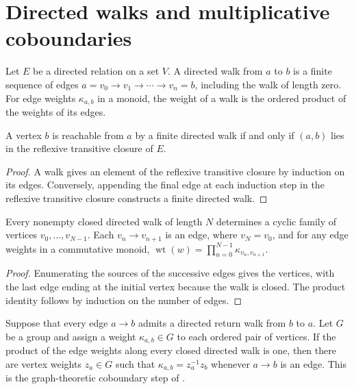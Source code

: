 \section{Directed walks and multiplicative coboundaries}

Let $E$ be a directed relation on a set $V$. A directed walk from $a$ to
$b$ is a finite sequence of edges $a=v_0\to v_1\to\cdots\to v_n=b$,
including the walk of length zero. For edge weights $\kappa_{a,b}$ in a
monoid, the weight of a walk is the ordered product of the weights of its
edges.

\begin{lemma}
    \label{lem:elementary_walk_reachability}
    \leanok
    A vertex $b$ is reachable from $a$ by a finite directed walk if and only
    if $(a,b)$ lies in the reflexive transitive closure of $E$.
\end{lemma}

\begin{proof}
    \leanok
    A walk gives an element of the reflexive transitive closure by induction
    on its edges. Conversely, appending the final edge at each induction step
    in the reflexive transitive closure constructs a finite directed walk.
\end{proof}

\begin{lemma}
    \label{lem:directed_closed_walk_finite_cycle}
    \leanok
    Every nonempty closed directed walk of length $N$ determines a cyclic
    family of vertices $v_0,\ldots,v_{N-1}$. Each $v_n\to v_{n+1}$ is an
    edge, where $v_N=v_0$, and for any edge weights in a commutative monoid,
    $\operatorname{wt}(w)=\prod_{n=0}^{N-1}\kappa_{v_n,v_{n+1}}$.
\end{lemma}

\begin{proof}
    \leanok
    Enumerating the sources of the successive edges gives the vertices, with
    the last edge ending at the initial vertex because the walk is closed. The
    product identity follows by induction on the number of edges.
\end{proof}

\begin{lemma}
    \label{thm:directed_cycle_coboundary}
    \leanok
    Suppose that every edge $a\to b$ admits a directed return walk from $b$
    to $a$. Let $G$ be a group and assign a weight $\kappa_{a,b}\in G$ to each
    ordered pair of vertices. If the product of the edge weights along every
    closed directed walk is one, then there are vertex weights $z_a\in G$
    such that $\kappa_{a,b}=z_a^{-1}z_b$ whenever $a\to b$ is an edge. This is
    the graph-theoretic coboundary step of
    \cite[Appendix~C.2, lines~1446--1450]{Cirac2016MPDO_arXiv}.
\end{lemma}

